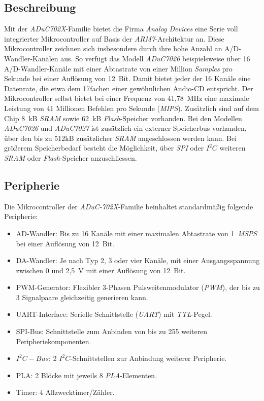     \subsection{Beschreibung}
        Mit der \emph{ADuC702X}-Familie bietet die Firma \emph{Analog Devices} eine Serie voll integrierter 
        Mikrocontroller auf Basis der \emph{ARM7}-Architektur an. Diese Mikrocontroller zeichnen sich insbesondere 
        durch ihre hohe Anzahl an A/D-Wandler-Kanälen aus. So verfügt das Modell \emph{ADuC7026} beispielsweise
        über 16 A/D-Wandler-Kanäle mit einer Abtastrate von einer Million \emph{Samples} pro Sekunde bei einer 
        Auflösung von 12~Bit. Damit bietet jeder der 16 Kanäle eine Datenrate, die etwa dem 17fachen einer 
        gewöhnlichen Audio-CD entspricht.  Der Mikrocontroller selbst bietet bei einer Frequenz von 
        41,78~MHz eine maximale Leistung von 41 Millionen Befehlen pro Sekunde (\emph{MIPS}). 
        Zusätzlich sind auf dem Chip 8~kB \emph{SRAM} sowie 62~kB \emph{Flash}-Speicher vorhanden. Bei den Modellen
        \emph{ADuC7026} und \emph{ADuC7027} ist zusätzlich ein externer Speicherbus vorhanden, über den bis zu 512kB 
        zusätzlicher \emph{SRAM} angeschlossen werden kann. Bei größerem Speicherbedarf besteht die Möglichkeit, über 
        \emph{SPI} oder \emph{$I^2C$} weiteren \emph{SRAM} oder \emph{Flash}-Speicher anzuschliessen.

    \subsection{Peripherie}
        Die Mikrocontroller der \emph{ADuC-702X}-Familie beinhaltet standardmäßig folgende Peripherie:

        \begin{itemize}
            \item{AD-Wandler:} Bis zu 16 Kanäle mit einer maximalen Abtastrate von 1~\emph{MSPS} bei einer Auflösung von 
                               12~Bit.
            \item{DA-Wandler:} Je nach Typ 2, 3 oder vier Kanäle, mit einer Ausgangsspannung zwischen 0 und 2,5~V mit einer
                               Auflösung von 12~Bit.
            \item{PWM-Generator:} Flexibler 3-Phasen Pulsweitenmodulator (\emph{PWM}), der bis zu 3 Signalpaare 
                                  gleichzeitig generieren kann.
            \item{UART-Interface:} Serielle Schnittstelle (\emph{UART}) mit \emph{TTL}-Pegel.
            \item{SPI-Bus:} Schnittstelle zum Anbinden von bis zu 255 weiteren Peripheriekomponenten.
            \item{$I^2C-Bus$:} 2 \emph{$I^2C$}-Schnittstellen zur Anbindung weiterer Peripherie.
            \item{PLA:} 2 Blöcke mit jeweils 8 \emph{PLA}-Elementen.
            \item{Timer:} 4 Allzwecktimer/Zähler.
        \end{itemize}
        
